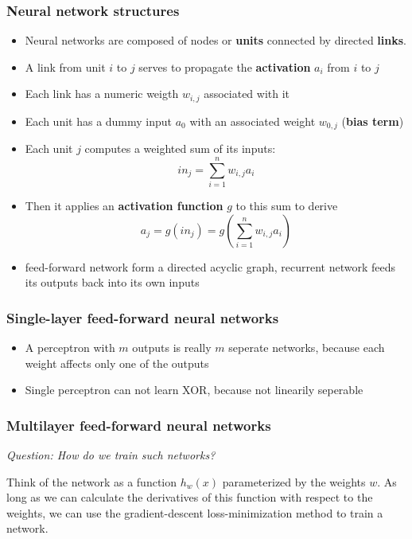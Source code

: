 \documentclass{scrartcl}
\begin{document}
\subsubsection{Neural network structures}
\begin{itemize}
    \item
        Neural networks are composed of nodes or \textbf{units} connected by directed \textbf{links}.
    \item
        A link from unit \(i\) to \(j\) serves to propagate the \textbf{activation} \(a_i\) from \(i\) to \(j\)
    \item
        Each link has a numeric weigth \(w_{i,j}\) associated with it
    \item
        Each unit has a dummy input \(a_0\) with an associated weight \(w_{0,j}\) (\textbf{bias term})
    \item
        Each unit \(j\) computes a weighted sum of its inputs:
        \[in_j = \sum_{i=1}^n w_{i,j} a_i\]
    \item
        Then it applies an \textbf{activation function} \(g\) to this sum to derive
        \[a_j = g(in_j) = g(\sum_{i=1}^n w_{i,j} a_i)\]
    \item
        feed-forward network form a directed acyclic graph, recurrent network feeds its outputs back into its own inputs
\end{itemize}

\subsubsection{Single-layer feed-forward neural networks}
\begin{itemize}
    \item
        A perceptron with \(m\) outputs is really \(m\) seperate networks, because each weight affects only one of the outputs
    \item
        Single perceptron can not learn XOR, because not linearily seperable
\end{itemize}

\subsubsection{Multilayer feed-forward neural networks}
\textit{Question: How do we train such networks?}

Think of the network as a function \(h_w(x)\) parameterized by the weights \(w\). As long as we can calculate the derivatives of this function with respect to the weights, we can use the gradient-descent loss-minimization method to train a network.
\end{document}
